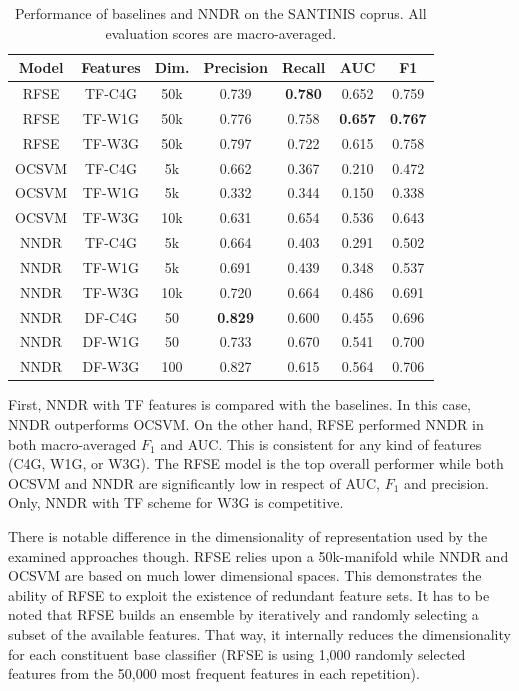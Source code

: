 \begin{table}[t]
\center
\caption {Performance of baselines and NNDR on the SANTINIS coprus. All evaluation scores are macro-averaged.}
\label{chap:word_embeddings:tbl:NNDR_RFSE_OCSVME_final}
\begin{tabular}{ccccccc}
\hline
Model & Features & Dim. & Precision & Recall & AUC & F1 \\
\hline
RFSE & TF-C4G & 50k & 0.739 & \textbf{0.780} & 0.652 & 0.759 \\
RFSE & TF-W1G & 50k & 0.776 & 0.758 & \textbf{0.657} & \textbf{0.767} \\
RFSE & TF-W3G & 50k & 0.797 & 0.722 & 0.615 & 0.758 \\
OCSVM & TF-C4G & 5k & 0.662 & 0.367 & 0.210 & 0.472\\
OCSVM & TF-W1G & 5k & 0.332 & 0.344 & 0.150 & 0.338\\
OCSVM & TF-W3G & 10k & 0.631 & 0.654 & 0.536 & 0.643\\
NNDR & TF-C4G & 5k & 0.664 & 0.403 & 0.291 & 0.502 \\
NNDR & TF-W1G & 5k & 0.691 & 0.439 & 0.348 & 0.537 \\
NNDR & TF-W3G & 10k & 0.720 & 0.664 & 0.486 & 0.691 \\
NNDR & DF-C4G & 50 & \textbf{0.829} & 0.600 & 0.455 & 0.696 \\
NNDR & DF-W1G & 50 & 0.733 & 0.670 & 0.541 & 0.700 \\
NNDR & DF-W3G & 100 & 0.827 & 0.615 & 0.564 & 0.706 \\
\hline
\end{tabular}
\end{table}

First, NNDR with TF features is compared with the baselines. In this case, NNDR outperforms OCSVM. On the other hand, RFSE performed NNDR in both macro-averaged $F_1$ and AUC. This is consistent for any kind of features (C4G, W1G, or W3G). The RFSE model is the top overall performer while both OCSVM and NNDR are significantly low in respect of AUC, $F_1$ and precision. Only, NNDR with TF scheme for W3G is competitive. 

There is notable difference in the dimensionality of representation used by the examined approaches though. RFSE relies upon a 50k-manifold while NNDR and OCSVM are based on much lower dimensional spaces. This demonstrates the ability of RFSE to exploit the existence of redundant feature sets. It has to be noted that RFSE builds an ensemble by iteratively and randomly selecting a subset of the available features. That way, it internally reduces the dimensionality for each constituent base classifier (RFSE is using 1,000 randomly selected features from the 50,000 most frequent features in each repetition). 


